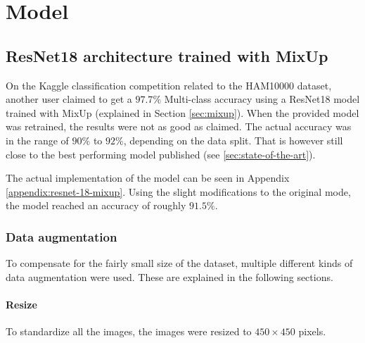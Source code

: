 \chapter{Model}\label{sec:model}
\section{ResNet18 architecture trained with MixUp}
On the Kaggle classification competition related to the HAM10000 dataset\cite{HAM10000-kaggle-competetion},
another user claimed to get a $97.7\%$ Multi-class accuracy using a ResNet18 model trained with MixUp 
(explained in Section \ref{sec:mixup})\cite{kaggle-97-model}.
When the provided model was retrained,
the results were not as good as claimed.
The actual accuracy was in the range of $90\%$ to $92\%$,
depending on the data split.
That is however still close to the best performing model published (see \ref{sec:state-of-the-art}).

The actual implementation of the model can be seen in Appendix \ref{appendix:resnet-18-mixup}.
Using the slight modifications to the original mode, the model reached an accuracy of roughly $91.5\%$.

\subsection{Data augmentation}
To compensate for the fairly small size of the dataset,
multiple different kinds of data augmentation were used.
These are explained in the following sections.
\subsubsection{Resize}
To standardize all the images, the images were resized to $450\times450$ pixels.


